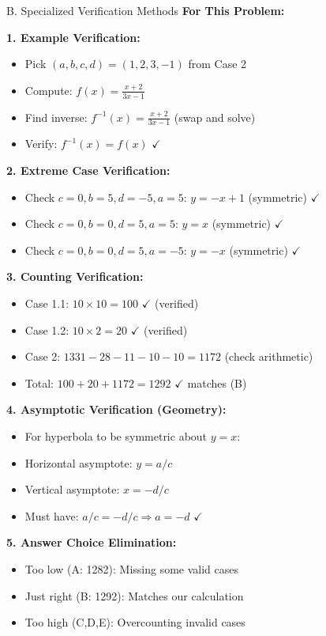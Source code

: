 \documentclass[12pt]{article}
\begin{document}
\begin{verificationbox}{B. Specialized Verification Methods}
\textbf{For This Problem:}

\textbf{1. Example Verification:}
\begin{itemize}
    \item Pick $(a,b,c,d) = (1,2,3,-1)$ from Case 2
    \item Compute: $f(x) = \frac{x+2}{3x-1}$
    \item Find inverse: $f^{-1}(x) = \frac{x+2}{3x-1}$ (swap and solve)
    \item Verify: $f^{-1}(x) = f(x)$ $\checkmark$
\end{itemize}

\textbf{2. Extreme Case Verification:}
\begin{itemize}
    \item Check $c=0, b=5, d=-5, a=5$: $y = -x+1$ (symmetric) $\checkmark$
    \item Check $c=0, b=0, d=5, a=5$: $y = x$ (symmetric) $\checkmark$
    \item Check $c=0, b=0, d=5, a=-5$: $y = -x$ (symmetric) $\checkmark$
\end{itemize}

\textbf{3. Counting Verification:}
\begin{itemize}
    \item Case 1.1: $10 \times 10 = 100$ $\checkmark$ (verified)
    \item Case 1.2: $10 \times 2 = 20$ $\checkmark$ (verified)
    \item Case 2: $1331 - 28 - 11 - 10 - 10 = 1172$ (check arithmetic)
    \item Total: $100 + 20 + 1172 = 1292$ $\checkmark$ matches (B)
\end{itemize}

\textbf{4. Asymptotic Verification (Geometry):}
\begin{itemize}
    \item For hyperbola to be symmetric about $y=x$:
    \item Horizontal asymptote: $y = a/c$
    \item Vertical asymptote: $x = -d/c$
    \item Must have: $a/c = -d/c \Rightarrow a = -d$ $\checkmark$
\end{itemize}

\textbf{5. Answer Choice Elimination:}
\begin{itemize}
    \item Too low (A: 1282): Missing some valid cases
    \item Just right (B: 1292): Matches our calculation
    \item Too high (C,D,E): Overcounting invalid cases
\end{itemize}
\end{verificationbox}
\end{document}
